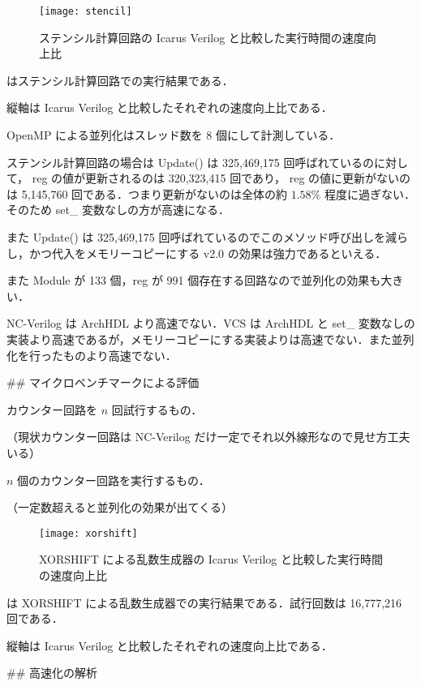 \begin{figure}[t]
 \centering
 \texttt{[image: stencil]}
 \caption{ステンシル計算回路の Icarus Verilog と比較した実行時間の速度向上比}
 \label{fig:stencil}
\end{figure}

 はステンシル計算回路での実行結果である．

縦軸は Icarus Verilog と比較したそれぞれの速度向上比である．

OpenMP による並列化はスレッド数を 8 個にして計測している．

ステンシル計算回路の場合は Update() は 325,469,175 回呼ばれているのに対して，
reg の値が更新されるのは 320,323,415 回であり，
reg の値に更新がないのは 5,145,760 回である．つまり更新がないのは全体の約
$1.58\%$ 程度に過ぎない．そのため set_ 変数なしの方が高速になる．

また Update() は 325,469,175 回呼ばれているのでこのメソッド呼び出しを減らし，かつ代入をメモリーコピーにする v2.0 の効果は強力であるといえる．

また Module が 133 個，reg が 991 個存在する回路なので並列化の効果も大きい．

NC-Verilog は ArchHDL より高速でない．VCS は ArchHDL と set_ 変数なしの実装より高速であるが，メモリーコピーにする実装よりは高速でない．また並列化を行ったものより高速でない．


## マイクロベンチマークによる評価

カウンター回路を $n$ 回試行するもの．

（現状カウンター回路は NC-Verilog だけ一定でそれ以外線形なので見せ方工夫いる）

$n$ 個のカウンター回路を実行するもの．

（一定数超えると並列化の効果が出てくる）


\begin{figure}[t]
 \centering
 \texttt{[image: xorshift]}
 \caption{XORSHIFT による乱数生成器の Icarus Verilog と比較した実行時間の速度向上比}
 \label{fig:xorshift}
\end{figure}

 は XORSHIFT による乱数生成器での実行結果である．試行回数は 16,777,216 回である．

縦軸は Icarus Verilog と比較したそれぞれの速度向上比である．









## 高速化の解析







